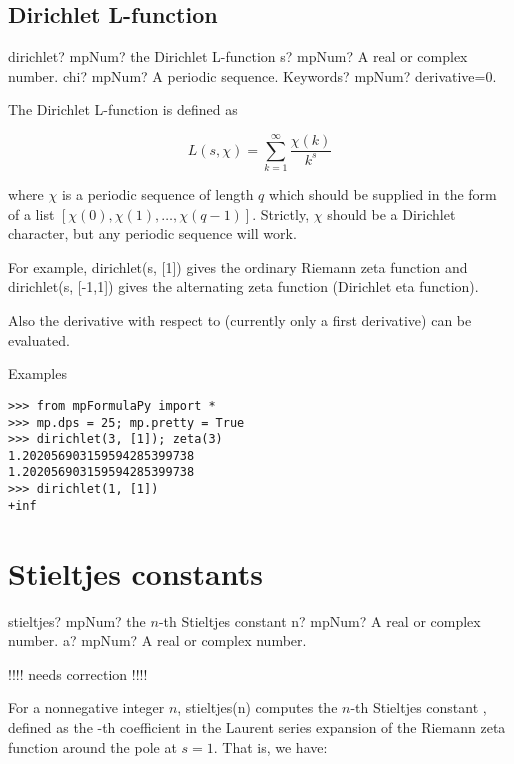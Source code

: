 \subsection{Dirichlet L-function}

\begin{mpFunctionsExtract}
	\mpFunctionThree
	{dirichlet? mpNum? the Dirichlet L-function}
	{s? mpNum? A real or complex number.}
	{chi? mpNum? A periodic sequence.}	
	{Keywords? mpNum? derivative=0.}	
\end{mpFunctionsExtract}

\vpara
The Dirichlet L-function is defined as

\begin{equation}
L(s,\chi)=\sum_{k=1}^{\infty} \frac{\chi(k)}{k^s}
\end{equation}

where $\chi$ is a periodic sequence of length $q$ which should be supplied in the form of a list $[\chi(0), \chi(1),\ldots,\chi(q-1)]$. Strictly, $\chi$ should be a Dirichlet character, but any periodic sequence will work.

\vpara
For example, dirichlet(s, [1]) gives the ordinary Riemann zeta function and dirichlet(s, [-1,1]) gives the alternating zeta function (Dirichlet eta function).

Also the derivative with respect to (currently only a first derivative) can be evaluated.

Examples

\begin{lstlisting}
>>> from mpFormulaPy import *
>>> mp.dps = 25; mp.pretty = True
>>> dirichlet(3, [1]); zeta(3)
1.202056903159594285399738
1.202056903159594285399738
>>> dirichlet(1, [1])
+inf
\end{lstlisting}


\newpage
\section{Stieltjes constants}


\begin{mpFunctionsExtract}
	\mpFunctionTwo
	{stieltjes? mpNum? the $n$-th Stieltjes constant}
	{n? mpNum? A real or complex number.}
	{a? mpNum? A real or complex number.}		
\end{mpFunctionsExtract}


!!!! needs correction !!!!

For a nonnegative integer $n$, stieltjes(n) computes the $n$-th Stieltjes constant , defined as the -th coefficient in the Laurent series expansion of the Riemann zeta function around the pole at $s=1$. That is, we have:

